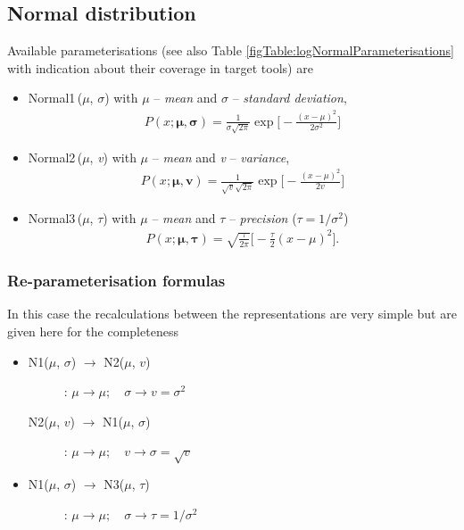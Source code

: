 {\subsection{Normal distribution}
Available parameterisations (see also Table \ref{figTable:logNormalParameterisations} 
with indication about their coverage in target tools) are
\begin{itemize}
\item
Normal1\,($\mu$, $\sigma$) with $\mu$ -- \emph{mean} and $\sigma$ -- \emph{standard deviation}, 
\begin{align*}
P(x;\boldsymbol\mu,\boldsymbol\sigma)= \frac{1}{\sigma \sqrt{2 \pi}}\exp\Big[-\frac{(x-\mu)^2}{2\sigma^2}\Big]
\end{align*}
\item
Normal2\,($\mu$, \emph{v}) with $\mu$ -- \emph{mean} and \emph{v} -- \emph{variance},
\begin{align*}
P(x;\boldsymbol\mu,\boldsymbol v)= \frac{1}{\sqrt{v} \sqrt{2 \pi}}\exp\Big[-\frac{(x-\mu)^2}{2v}\Big]
\end{align*}
\item
Normal3\,($\mu$, $\tau$) with $\mu$ -- \emph{mean} and $\tau$ -- \emph{precision} ($\tau=1/\sigma^2$)
\begin{align*}
P(x;\boldsymbol\mu,\boldsymbol\tau)= \sqrt{\frac{\tau}{2 \pi}} \Big[-\frac{\tau}{2}(x-\mu)^2\Big].
\end{align*}
\end{itemize}

\subsubsection{Re-parameterisation formulas}
In this case the recalculations between the representations are very simple
but are given here for the completeness
\begin{itemize}
\item 
\begin{description}
\item[N1($\mu$, $\sigma$) $\rightarrow$ N2($\mu$, $v$)]:
$\mu \rightarrow \mu; \quad \sigma \rightarrow v=\sigma^2$

\item[N2($\mu$, $v$) $\rightarrow$ N1($\mu$, $\sigma$)]:
$\mu \rightarrow \mu; \quad v \rightarrow \sigma = \sqrt{v}$
\end{description}

\item 
\begin{description}
\item[N1($\mu$, $\sigma$) $\rightarrow$ N3($\mu$, $\tau$)]:
$\mu \rightarrow \mu; \quad \sigma \rightarrow \tau=1/\sigma^2$


\end{description}
\end{itemize}}
